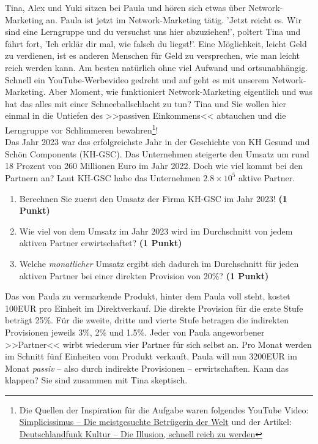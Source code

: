\documentclass[a4paper, 9pt]{scrartcl}\usepackage[]{graphicx}\usepackage[]{xcolor}
\begin{document}
Tina, Alex und Yuki sitzen bei Paula und hören sich etwas über Network-Marketing an. Paula ist jetzt im Network-Marketing tätig. 'Jetzt reicht es. Wir sind eine Lerngruppe und du versuchst uns hier abzuziehen!', poltert Tina und fährt fort, 'Ich erklär dir mal, wie falsch du liegst!'. Eine Möglichkeit, leicht Geld zu verdienen, ist es anderen Menschen für Geld zu versprechen, wie man leicht reich werden kann. Am besten natürlich ohne viel Aufwand und ortsunabhängig. Schnell ein YouTube-Werbevideo gedreht und auf geht es mit unserem Network-Marketing. Aber Moment, wie funktioniert Network-Marketing eigentlich und was hat das alles mit einer Schneeballschlacht zu tun? Tina und Sie wollen hier einmal in die Untiefen des >>passiven Einkommens<< abtauchen und die Lerngruppe vor Schlimmeren bewahren\footnote{Die Quellen der Inspiration für die Aufgabe waren folgendes YouTube Video: \href{https://youtu.be/UOKkZF_qK9M?si=uf4foJVFKfeQMwSw}{Simplicissimus -- Die meistgesuchte Betrügerin der Welt} und der Artikel: \href{https://www.deutschlandfunkkultur.de/netzwerk-marketing-die-illusion-schnell-reich-zu-werden-100.html}{Deutschlandfunk Kultur -- Die Illusion, schnell reich zu werden}}!\\

Das Jahr 2023 war das erfolgreichste Jahr in der Geschichte von KH Gesund und Schön Components (KH-GSC). Das Unternehmen steigerte den Umsatz um rund 18 Prozent von 260 Millionen Euro im Jahr 2022. Doch wie viel kommt bei den Partnern an? Laut KH-GSC habe das Unternehmen \ensuremath{2.8\times 10^{5}} aktive Partner.

\begin{enumerate}
\item Berechnen Sie zuerst den Umsatz der Firma KH-GSC im Jahr 2023! \textbf{(1 Punkt)}
\item Wie viel von dem Umsatz im Jahr 2023 wird im Durchschnitt von jedem aktiven Partner erwirtschaftet? \textbf{(1 Punkt)}
\item Welche \textit{monatlicher} Umsatz ergibt sich dadurch im Durchschnitt für jeden aktiven Partner bei einer direkten Provision von 20\%? \textbf{(1 Punkt)}
\end{enumerate}

Das von Paula zu vermarkende Produkt, hinter dem Paula voll steht, kostet 100EUR pro Einheit im Direktverkauf. Die direkte Provision für die erste Stufe beträgt 25\%. Für die zweite, dritte und vierte Stufe betragen die indirekten Provisionen jeweils 3\%, 2\% und 1.5\%. Jeder von Paula angeworbener >>Partner<< wirbt wiederum vier Partner für sich selbst an. Pro Monat werden im Schnitt fünf Einheiten vom Produkt verkauft. Paula will nun 3200EUR im Monat \textit{passiv} -- also durch indirekte Provisionen -- erwirtschaften. Kann das klappen? Sie sind zusammen mit Tina skeptisch.
\end{document}

